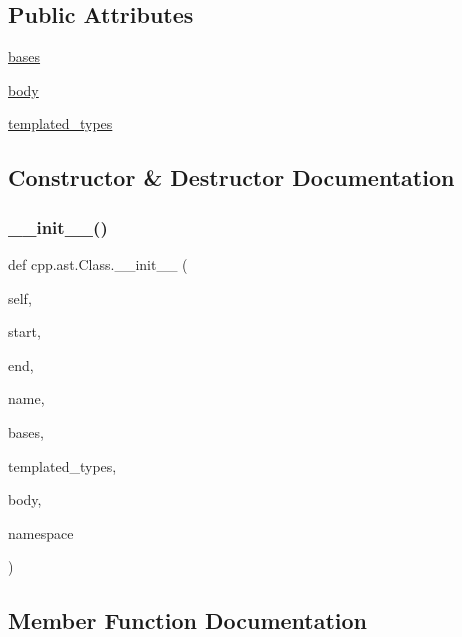 \subsection*{Public Attributes}
\begin{DoxyCompactItemize}
\item 
\mbox{\hyperlink{classcpp_1_1ast_1_1_class_a5665eb67314a075d4e0ff91accbde5d1}{bases}}
\item 
\mbox{\hyperlink{classcpp_1_1ast_1_1_class_add39f61fdcf6dae42d79cac3dcbb7782}{body}}
\item 
\mbox{\hyperlink{classcpp_1_1ast_1_1_class_a48ed0d3115656554d9134bc1787390fa}{templated\+\_\+types}}
\end{DoxyCompactItemize}


\subsection{Constructor \& Destructor Documentation}
\mbox{\label{classcpp_1_1ast_1_1_class_acc17c34512d5cc54d5125734ce79f219}} 
\subsubsection{\texorpdfstring{\_\_init\_\_()}{\_\_init\_\_()}}
{\footnotesize\ttfamily def cpp.\+ast.\+Class.\+\_\+\+\_\+init\+\_\+\+\_\+ (\begin{DoxyParamCaption}\item[{}]{self,  }\item[{}]{start,  }\item[{}]{end,  }\item[{}]{name,  }\item[{}]{bases,  }\item[{}]{templated\+\_\+types,  }\item[{}]{body,  }\item[{}]{namespace }\end{DoxyParamCaption})}



\subsection{Member Function Documentation}
\mbox{\label{classcpp_1_1ast_1_1_class_a0a63f6fab75d61ffac6fb9f1c29ae84d}} 
